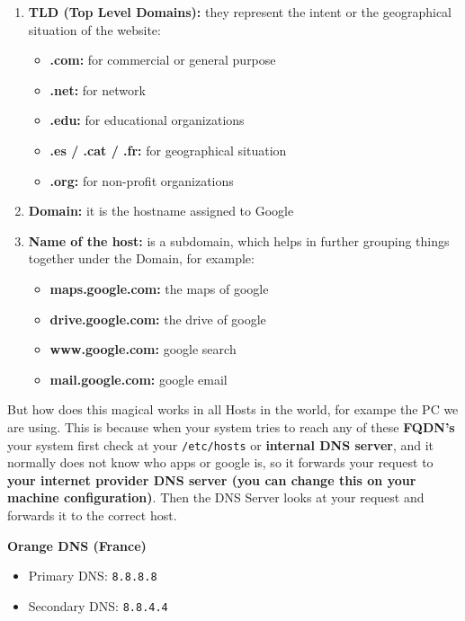 \documentclass{article}
\begin{document}
\begin{enumerate}
    \item \textbf{TLD (Top Level Domains):} they represent the intent or the geographical situation of the website:
    \begin{itemize}
        \item \textbf{.com:} for commercial or general purpose
        \item \textbf{.net:} for network
        \item \textbf{.edu:} for educational organizations
        \item \textbf{.es / .cat / .fr:} for geographical situation
        \item \textbf{.org:} for non-profit organizations
    \end{itemize}

    \item \textbf{Domain:} it is the hostname assigned to Google
    \item \textbf{Name of the host:} is a subdomain, which helps in further grouping things together under the Domain, for example:
    \begin{itemize}
        \item \textbf{maps.google.com:} the maps of google
        \item \textbf{drive.google.com:} the drive of google
        \item \textbf{www.google.com:} google search
        \item \textbf{mail.google.com:} google email
    \end{itemize}
\end{enumerate}

But how does this magical works in all Hosts in the world, for exampe the PC we are using. This is because when your system tries to reach any of these \textbf{FQDN's} your system first check at your \verb|/etc/hosts| or \textbf{internal DNS server}, and it normally does not know who apps or google is, so it forwards your request to
\textbf{your internet provider DNS server (you can change this on your machine configuration)}. Then the DNS Server looks at your request and forwards it to the correct host.

\textbf{Orange DNS (France)}
\begin{itemize}
    \item Primary DNS: \texttt{8.8.8.8}
    \item Secondary DNS: \texttt{8.8.4.4}
\end{itemize}
\end{document}
